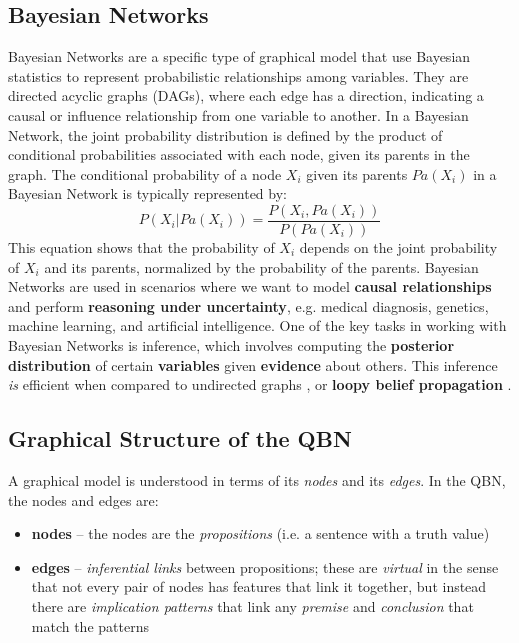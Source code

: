 \documentclass[12pt]{article}
\begin{document}
\subsection{Bayesian Networks}
Bayesian Networks are a specific type of graphical model that use Bayesian statistics to represent probabilistic relationships among variables. They are directed acyclic graphs (DAGs), where each edge has a direction, indicating a causal or influence relationship from one variable to another. In a Bayesian Network, the joint probability distribution is defined by the product of conditional probabilities associated with each node, given its parents in the graph.
The conditional probability of a node \( X_i \) given its parents \( Pa(X_i) \) in a Bayesian Network is typically represented by:
\begin{equation}
    P(X_i | Pa(X_i)) = \frac{P(X_i, Pa(X_i))}{P(Pa(X_i))}
\end{equation}
This equation shows that the probability of \( X_i \) depends on the joint probability of \( X_i \) and its parents, normalized by the probability of the parents. 
Bayesian Networks are used in scenarios where we want to model {\bf causal relationships} and perform {\bf reasoning under uncertainty}, e.g. medical diagnosis, genetics, machine learning, and artificial intelligence. 
One of the key tasks in working with Bayesian Networks is inference, which involves computing the {\bf posterior distribution} of certain {\bf variables} given {\bf evidence} about others.
This inference {\em is} efficient when compared to undirected graphs \cite{richardson2006markov}, or {\bf loopy belief propagation} \cite{smith2008dependency}.

\subsection{Graphical Structure of the QBN}
A graphical model is understood in terms of its {\em nodes} and its {\em edges}.
In the QBN, the nodes and edges are:
\begin{itemize}
    \item {\bf nodes} -- the nodes are the {\em propositions} (i.e. a sentence with a truth value)
    \item {\bf edges} -- {\em inferential links} between propositions; these are {\em virtual} in the sense that not every pair of nodes has features that link it together, but instead there are {\em implication patterns} that link any {\em premise} and {\em conclusion} that match the patterns
\end{itemize}
\end{document}
